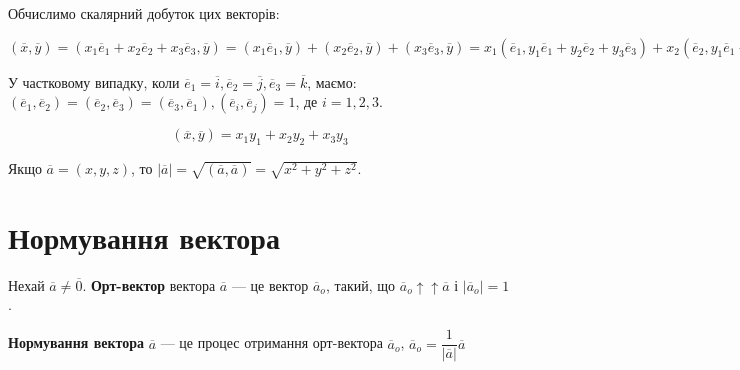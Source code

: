 Обчислимо скалярний добуток цих векторів: 

\noindent\parbox{\textwidth}{\raggedright$(\overline{x}, \overline{y})
= (x_1\overline{e}_1 + x_2\overline{e}_2 + x_3\overline{e}_3, \overline{y})
= (x_1 \overline{e}_1, \overline{y}) + (x_2 \overline{e}_2, \overline{y})
+ (x_3 \overline{e}_3, \overline{y})
= x_1(\overline{e}_1, y_1\overline{e}_1 + y_2\overline{e}_2 + y_3\overline{e}_3)
+ x_2(\overline{e}_2, y_1\overline{e}_1 + y_2\overline{e}_2 + y_3\overline{e}_3)
+ x_3(\overline{e}_3, y_1\overline{e}_1 + y_2\overline{e}_2 + y_3\overline{e}_3)
= x_1 y_1(\overline{e}_1, \overline{e}_1)
+ x_1 y_2(\overline{e}_1, \overline{e}_2)
+ x_1 y_3(\overline{e}_1, \overline{e}_3)
+ x_2 y_1(\overline{e}_2, \overline{e}_1)
+ x_2 y_2(\overline{e}_2, \overline{e}_2)
+ x_2 y_3(\overline{e}_2, \overline{e}_3)
+ x_3 y_1(\overline{e}_3, \overline{e}_1)
+ x_3 y_2(\overline{e}_3, \overline{e}_2)
+ x_3 y_3(\overline{e}_3, \overline{e}_3)
= x_1 y_1(\overline{e}_1, \overline{e}_1)
+ (x_1 y_2 + x_2 y_1)(\overline{e}_1, \overline{e}_2)
+ (x_1 y_3 + x_3 y_1)(\overline{e}_1, \overline{e}_3)
+ x_2 y_2(\overline{e}_2, \overline{e}_2)
+ (x_2 y_3 + x_3 y_2)(\overline{e}_2, \overline{e}_3)
+ x_3 y_3(\overline{e}_3, \overline{e}_3).$}

У частковому випадку, коли $\overline{e}_1 = \overline{i}, \overline{e}_2 = \overline{j}, \overline{e}_3 = \overline{k}$, маємо: 
$(\overline{e}_1, \overline{e}_2) = (\overline{e}_2, \overline{e}_3) = (\overline{e}_3, \overline{e}_1), (\overline{e}_i, \overline{e}_j) = 1$, де $i = 1, 2, 3$.

$$(\overline{x}, \overline{y}) = x_1 y_1 + x_2 y_2 + x_3 y_3$$

Якщо $\overline{a} = (x, y, z)$, то $|\overline{a}| = \sqrt{(\overline{a}, \overline{a})} = \sqrt{x^2 + y^2 + z^2}$.

\section{Нормування вектора}

\begin{definition}
	Нехай $\overline{a} \neq \overline{0}$. \textbf{Орт-вектор} вектора $\overline{a}$ --- це вектор $\overline{a}_o$, такий, що $\overline{a}_o \uparrow\uparrow \overline{a}$ і $|\overline{a}_o| = 1$. 
\end{definition}

\begin{definition}
	 \textbf{Нормування вектора} $\overline{a}$ --- це процес отримання орт-вектора $\overline{a}_o$, $\overline{a}_o = \dfrac{1}{|\overline{a}|}\overline{a}$
\end{definition}

